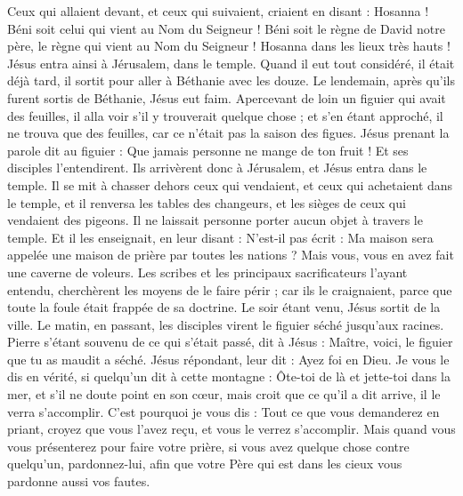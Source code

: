 \begin{multicols}{2}
Ceux qui allaient devant, et ceux qui suivaient, criaient en disant : Hosanna ! Béni soit celui qui vient au Nom du Seigneur !
Béni soit le règne de David notre père, le règne qui vient au Nom du Seigneur ! Hosanna dans les lieux très hauts !
Jésus entra ainsi à Jérusalem, dans le temple. Quand il eut tout considéré, il était déjà tard, il sortit pour aller à Béthanie avec les douze.
Le lendemain, après qu’ils furent sortis de Béthanie, Jésus eut faim.
Apercevant de loin un figuier qui avait des feuilles, il alla voir s'il y trouverait quelque chose ; et s’en étant approché, il ne trouva que des feuilles, car ce n'était pas la saison des figues.
Jésus prenant la parole dit au figuier : Que jamais personne ne mange de ton fruit ! Et ses disciples l'entendirent.
Ils arrivèrent donc à Jérusalem, et Jésus entra dans le temple. Il se mit à chasser dehors ceux qui vendaient, et ceux qui achetaient dans le temple, et il renversa les tables des changeurs, et les sièges de ceux qui vendaient des pigeons.
Il ne laissait personne porter aucun objet à travers le temple.
Et il les enseignait, en leur disant : N'est-il pas écrit : Ma maison sera appelée une maison de prière par toutes les nations ? Mais vous, vous en avez fait une caverne de voleurs{}.
Les scribes et les principaux sacrificateurs l’ayant entendu, cherchèrent les moyens de le faire périr ; car ils le craignaient, parce que toute la foule était frappée de sa doctrine.
Le soir étant venu, Jésus sortit de la ville.
Le matin, en passant, les disciples virent le figuier séché jusqu’aux racines.
Pierre s'étant souvenu de ce qui s'était passé, dit à Jésus : Maître, voici, le figuier que tu as maudit a séché.
Jésus répondant, leur dit : Ayez foi en Dieu.
Je vous le dis en vérité, si quelqu’un dit à cette montagne : Ôte-toi de là et jette-toi dans la mer, et s’il ne doute point en son cœur, mais croit que ce qu’il a dit arrive, il le verra s’accomplir.
C'est pourquoi je vous dis : Tout ce que vous demanderez en priant, croyez que vous l’avez reçu, et vous le verrez s’accomplir.
\TextTitle{[Le pardon]}
Mais quand vous vous présenterez pour faire votre prière, si vous avez quelque chose contre quelqu'un, pardonnez-lui, afin que votre Père qui est dans les cieux vous pardonne aussi vos fautes.

\end{multicols}
